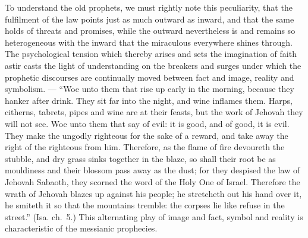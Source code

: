 \documentclass[12pt,a4paper,openany]{book}
\newcommand{\opage}[1]{\marginnote{\footnotesize\textit{[#1]}}}
\begin{document}
To understand the old prophets, we must rightly
note this peculiarity, that the fulfilment of the law
points just as much outward as inward, and that the
same holds of threats and promises, while the
outward nevertheless is and remains so heterogeneous with the
inward that the miraculous everywhere shines through.
The psychological tension which thereby arises
and sets the imagination of faith astir casts the light of understanding
on the breakers and surges under which
the prophetic discourses are continually moved between fact
and image, reality and symbolism. --- ``Woe
unto them that rise up early in the morning, because they hanker
after drink. They sit far into the night, and wine
inflames them. Harps, citherns, tabrets, pipes and wine
are at their feasts, but the work of Jehovah they will
not see. Woe unto them that say of evil: it is
good, and of good, it is evil. They make the
ungodly righteous for the sake of a reward, and take away
the right of the righteous from him. Therefore, as the flame
of fire devoureth the stubble, and dry grass sinks together
in the blaze, so shall their root be as mouldiness and
their blossom pass away as the dust; for they despised
the law of Jehovah Sabaoth, they scorned the word of the Holy One
of Israel. Therefore the wrath of Jehovah blazes up against his people;
he stretcheth out his hand over it, he smiteth it
\setcounter{footnote}{0}%
\opage{53}so that the mountains tremble: the corpses lie like refuse in
the street.'' (Isa. ch.~5.) This alternating play of image and
fact, symbol and reality is characteristic
of the messianic prophecies.
\end{document}

